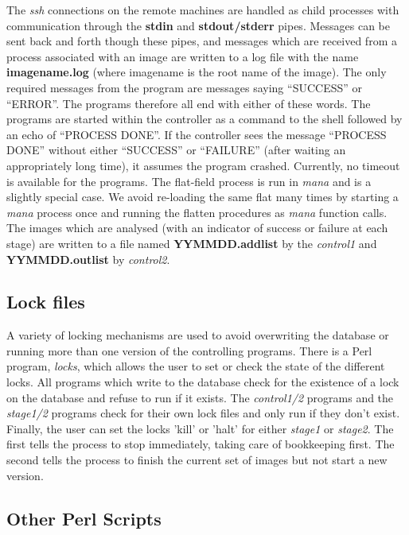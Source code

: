 \documentclass{article}
\newcommand\pr{\em}                   %
\newcommand\ff{\bf}                   %
\begin{document}
{The {\pr ssh} connections on the remote machines are handled as child
processes with communication through the {\ff stdin} and {\ff
stdout/stderr} pipes.  Messages can be sent back and forth though
these pipes, and messages which are received from a process associated
with an image are written to a log file with the name {\ff
imagename.log} (where imagename is the root name of the image).  The
only required messages from the program are messages saying
``SUCCESS'' or ``ERROR''.  The programs therefore all end with either
of these words.  The programs are started within the controller as a
command to the shell followed by an echo of ``PROCESS DONE''.  If the
controller sees the message ``PROCESS DONE'' without either
``SUCCESS'' or ``FAILURE'' (after waiting an appropriately long time),
it assumes the program crashed.  Currently, no timeout is available
for the programs.  The flat-field process is run in {\pr mana} and is
a slightly special case.  We avoid re-loading the same flat many times
by starting a {\pr mana} process once and running the flatten
procedures as {\pr mana} function calls.  The images which are
analysed (with an indicator of success or failure at each stage) are
written to a file named {\ff YYMMDD.addlist} by the {\pr control1} and
\ff YYMMDD.outlist} by {\pr control2}.

\subsection{Lock files}

A variety of locking mechanisms are used to avoid overwriting the
database or running more than one version of the controlling programs.
There is a Perl program, {\pr locks}, which allows the user to set or
check the state of the different locks. All programs which write to
the database check for the existence of a lock on the database and
refuse to run if it exists.  The {\pr control1/2} programs and the
{\pr stage1/2} programs check for their own lock files and only run if
they don't exist.  Finally, the user can set the locks 'kill' or
'halt' for either {\pr stage1} or {\pr stage2}.  The first tells the
process to stop immediately, taking care of bookkeeping first.  The
second tells the process to finish the current set of images but not
start a new version.

\subsection{Other Perl Scripts} 
\end{document}
